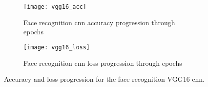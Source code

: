 \begin{figure}[H]
	\centering
	\begin{subfigure}{0.48\textwidth}
		\centering
		\texttt{[image: vgg16\_acc]}
		\caption{Face recognition \gls{cnn} accuracy progression through epochs}
		\label{fig:vgg16_acc}
	\end{subfigure}
	\begin{subfigure}{0.48\textwidth}
		\centering
		\texttt{[image: vgg16\_loss]}
		\caption{Face recognition \gls{cnn} loss progression through epochs}
		\label{fig:vgg16_loss}
	\end{subfigure}
	\caption{Accuracy and loss progression for the face recognition VGG16 \gls{cnn}.}
	\label{fig:vgg_graphs}
\end{figure}